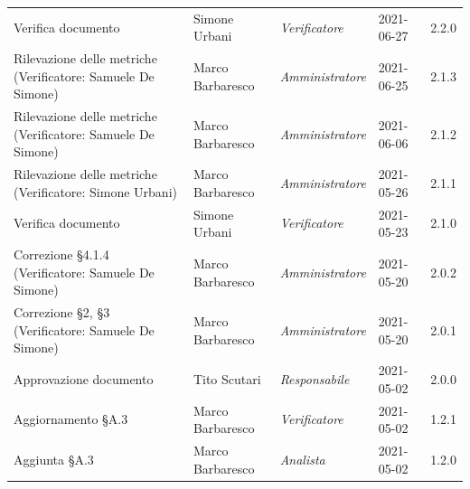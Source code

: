 \documentclass[a4paper]{article}
\begin{document}
\begin{center}
\begin{longtable}[!h]{p{160px} p{80px} p{70px} p{55px} p{40px}}
        Verifica documento \newline                                                                        & Simone Urbani     & \textit{Verificatore}   & 2021-06-27    & 2.2.0             \\
        Rilevazione delle metriche \newline (Verificatore: Samuele De Simone)                              & Marco Barbaresco  & \textit{Amministratore} & 2021-06-25    & 2.1.3             \\
        Rilevazione delle metriche \newline (Verificatore: Samuele De Simone)                              & Marco Barbaresco  & \textit{Amministratore} & 2021-06-06    & 2.1.2             \\
        Rilevazione delle metriche \newline (Verificatore: Simone Urbani)                                  & Marco Barbaresco  & \textit{Amministratore} & 2021-05-26    & 2.1.1             \\
        Verifica documento \newline                                                                        & Simone Urbani     & \textit{Verificatore}   & 2021-05-23    & 2.1.0             \\
        Correzione \S 4.1.4 \newline (Verificatore: Samuele De Simone)                                     & Marco Barbaresco  & \textit{Amministratore} & 2021-05-20    & 2.0.2             \\
        Correzione \S2, \S3 \newline (Verificatore: Samuele De Simone)                                     & Marco Barbaresco  & \textit{Amministratore} & 2021-05-20    & 2.0.1             \\
        Approvazione documento                                                                             & Tito Scutari      & \textit{Responsabile}   & 2021-05-02    & 2.0.0             \\
        Aggiornamento \S A.3                                                                               & Marco Barbaresco  & \textit{Verificatore}   & 2021-05-02    & 1.2.1             \\
        Aggiunta \S A.3                                                                                    & Marco Barbaresco  & \textit{Analista}       & 2021-05-02    & 1.2.0             \\

\end{longtable}
\end{center}
\end{document}
